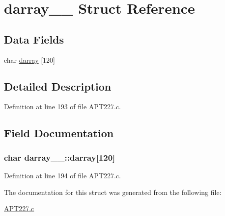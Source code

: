 \hypertarget{structdarray__1__}{}\section{darray\+\_\+\_\+ Struct Reference}
\label{structdarray__1__}
\subsection*{Data Fields}
\begin{DoxyCompactItemize}
\item 
char \hyperlink{structdarray__1___a0bd9896c5410301ac0c6210156a40188}{darray} \mbox{[}120\mbox{]}
\end{DoxyCompactItemize}


\subsection{Detailed Description}


Definition at line 193 of file A\+P\+T227.\+c.



\subsection{Field Documentation}
\subsubsection[{\texorpdfstring{darray}{darray}}]{\setlength{\rightskip}{0pt plus 5cm}char darray\+\_\+\_\+\+::darray\mbox{[}120\mbox{]}}\hypertarget{structdarray__1___a0bd9896c5410301ac0c6210156a40188}{}\label{structdarray__1___a0bd9896c5410301ac0c6210156a40188}


Definition at line 194 of file A\+P\+T227.\+c.



The documentation for this struct was generated from the following file\+:\begin{DoxyCompactItemize}
\item 
\hyperlink{APT227_8c}{A\+P\+T227.\+c}\end{DoxyCompactItemize}
